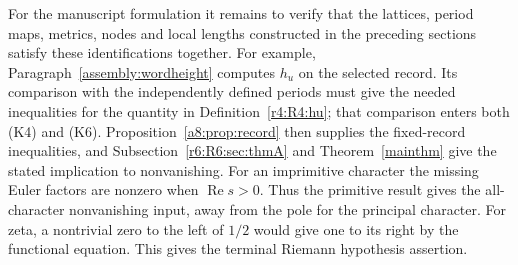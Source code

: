 For the manuscript formulation it remains to verify that the lattices,
period maps, metrics, nodes and local lengths constructed in the
preceding sections satisfy these identifications together. For example,
Paragraph~\ref{assembly:wordheight} computes $h_u$ on the selected record. Its comparison with the independently defined periods must give the
needed inequalities for the quantity
in Definition~\ref{r4:R4:hu}; that comparison enters both (K4) and
(K6). Proposition~\ref{a8:prop:record} then supplies the fixed-record
inequalities, and Subsection~\ref{r6:R6:sec:thmA} and
Theorem~\ref{mainthm} give the stated implication to nonvanishing.
For an imprimitive character the missing Euler factors are nonzero
when $\operatorname{Re}s>0$. Thus the primitive result gives the
all-character nonvanishing input, away from the pole for the principal
character. For zeta, a nontrivial zero to the left of $1/2$ would give
one to its right by the functional equation. This gives the terminal
Riemann hypothesis assertion.


